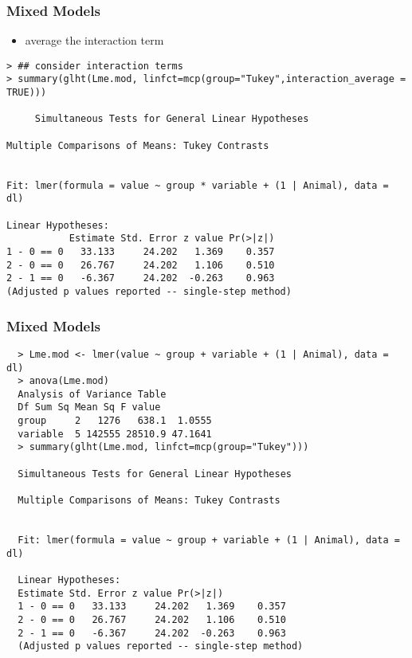 \begin{frame}\frametitle{Mixed Models}
  \begin{itemize}
  \item average the interaction term
  \end{itemize}
\scriptsize
\begin{verbatim}
> ## consider interaction terms
> summary(glht(Lme.mod, linfct=mcp(group="Tukey",interaction_average = TRUE)))

	 Simultaneous Tests for General Linear Hypotheses

Multiple Comparisons of Means: Tukey Contrasts


Fit: lmer(formula = value ~ group * variable + (1 | Animal), data = dl)

Linear Hypotheses:
           Estimate Std. Error z value Pr(>|z|)
1 - 0 == 0   33.133     24.202   1.369    0.357
2 - 0 == 0   26.767     24.202   1.106    0.510
2 - 1 == 0   -6.367     24.202  -0.263    0.963
(Adjusted p values reported -- single-step method)
\end{verbatim}
\end{frame}


\begin{frame}\frametitle{Mixed Models}
\scriptsize
\begin{verbatim}
  > Lme.mod <- lmer(value ~ group + variable + (1 | Animal), data = dl)
  > anova(Lme.mod)
  Analysis of Variance Table
  Df Sum Sq Mean Sq F value
  group     2   1276   638.1  1.0555
  variable  5 142555 28510.9 47.1641
  > summary(glht(Lme.mod, linfct=mcp(group="Tukey")))

  Simultaneous Tests for General Linear Hypotheses

  Multiple Comparisons of Means: Tukey Contrasts


  Fit: lmer(formula = value ~ group + variable + (1 | Animal), data = dl)

  Linear Hypotheses:
  Estimate Std. Error z value Pr(>|z|)
  1 - 0 == 0   33.133     24.202   1.369    0.357
  2 - 0 == 0   26.767     24.202   1.106    0.510
  2 - 1 == 0   -6.367     24.202  -0.263    0.963
  (Adjusted p values reported -- single-step method)
\end{verbatim}
\end{frame}



